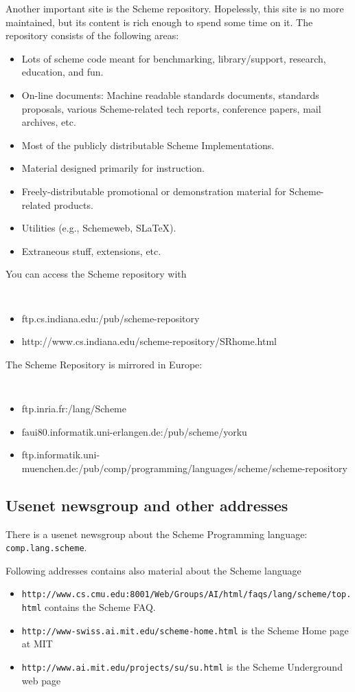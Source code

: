 Another important site is the Scheme repository. Hopelessly, this site is no more maintained, but its
content is rich enough to spend some time on it. The repository
consists of the following areas:
\begin{itemize}
\item Lots of scheme code meant for benchmarking, library/support, research, education, and fun. 
\item On-line documents: Machine readable standards documents, standards proposals, various Scheme-related tech reports, conference papers, mail archives, etc. 
\item Most of the publicly distributable Scheme Implementations. 
\item Material designed primarily for instruction. 
\item Freely-distributable promotional or demonstration material for Scheme-related products. 
\item Utilities (e.g., Schemeweb, SLaTeX). 
\item Extraneous stuff, extensions, etc. 
\end{itemize}
You can access the Scheme repository with
{\tt
\begin{itemize}
\item ftp.cs.indiana.edu:/pub/scheme-repository
\item http://www.cs.indiana.edu/scheme-repository/SRhome.html
\end{itemize}
}
The Scheme Repository is mirrored in Europe: 
{\tt
\begin{itemize}
\item     ftp.inria.fr:/lang/Scheme
\item     faui80.informatik.uni-erlangen.de:/pub/scheme/yorku
\item     ftp.informatik.uni-muenchen.de:/pub/comp/programming/languages/scheme/scheme-repository
\end{itemize}
}

\subsection{Usenet newsgroup and other addresses}

There is a usenet newsgroup about the Scheme Programming language: {\tt
comp.lang.scheme}.

Following addresses contains also material about the Scheme language

\begin{itemize}
\item {\tt http://www.cs.cmu.edu:8001/Web/Groups/AI/html/faqs/lang/scheme/top.html}
contains the Scheme FAQ.
\item {\tt http://www-swiss.ai.mit.edu/scheme-home.html} is the Scheme Home page
at MIT
\item {\tt http://www.ai.mit.edu/projects/su/su.html} is the Scheme Underground
web page
\end{itemize}

